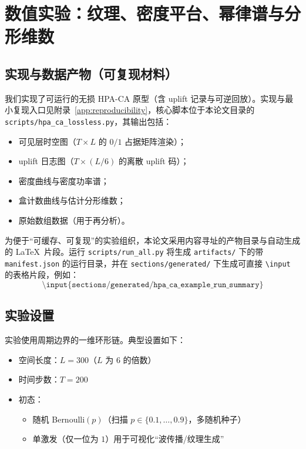 
\section{数值实验：纹理、密度平台、幂律谱与分形维数}

\subsection{实现与数据产物（可复现材料）}

我们实现了可运行的无损 HPA-CA 原型（含 uplift 记录与可逆回放）。实现与最小复现入口见附录~\ref{app:reproducibility}，核心脚本位于本论文目录的 \texttt{scripts/hpa\_ca\_lossless.py}，其输出包括：
\begin{itemize}
  \item 可见层时空图（$T\times L$ 的 $0/1$ 占据矩阵渲染）；
  \item uplift 日志图（$T\times (L/6)$ 的离散 uplift 码）；
  \item 密度曲线与密度功率谱；
  \item 盒计数曲线与估计分形维数；
  \item 原始数组数据（用于再分析）。
\end{itemize}

为便于“可缓存、可复现”的实验组织，本论文采用内容寻址的产物目录与自动生成的 \LaTeX\ 片段。运行 \texttt{scripts/run\_all.py} 将生成 \texttt{artifacts/} 下的带 \texttt{manifest.json} 的运行目录，并在 \texttt{sections/generated/} 下生成可直接 \texttt{\textbackslash input} 的表格片段，例如：
$$
\texttt{\textbackslash input\{sections/generated/hpa\_ca\_example\_run\_summary\}}
$$

\subsection{实验设置}

实验使用周期边界的一维环形链。典型设置如下：
\begin{itemize}
  \item 空间长度：$L=300$（$L$ 为 $6$ 的倍数）
  \item 时间步数：$T=200$
  \item 初态：
  \begin{itemize}
    \item 随机 Bernoulli$(p)$（扫描 $p\in\{0.1,\dots,0.9\}$，多随机种子）
    \item 单激发（仅一位为 $1$）用于可视化“波传播/纹理生成”
  \end{itemize}
\end{itemize}

